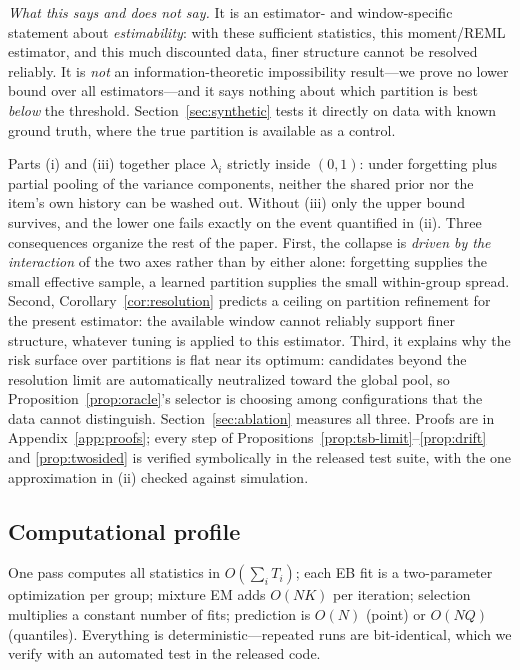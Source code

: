 \documentclass[twocolumn,10pt]{article}
\begin{document}
\emph{What this says and does not say.} It is an estimator- and
window-specific statement about \emph{estimability}: with these
sufficient statistics, this moment/REML estimator, and this much
discounted data, finer structure cannot be resolved reliably. It is
\emph{not} an information-theoretic impossibility result---we prove no
lower bound over all estimators---and it says nothing about which
partition is best \emph{below} the threshold. Section~\ref{sec:synthetic}
tests it directly on data with known ground truth, where the true
partition is available as a control.

Parts (i) and (iii) together place $\lambda_i$ strictly inside $(0,1)$:
under forgetting plus partial pooling of the variance components,
neither the shared prior nor the item's own history can be washed out.
Without (iii) only the upper bound survives, and the lower one fails
exactly on the event quantified in (ii). Three consequences organize the
rest of the paper. First, the collapse is \emph{driven by the
interaction} of the two axes rather than by either alone: forgetting
supplies the small effective sample, a learned partition supplies the
small within-group spread. Second,
Corollary~\ref{cor:resolution} predicts a ceiling on partition refinement
for the present estimator: the available window cannot reliably support
finer structure, whatever tuning is applied to this estimator. Third, it explains why the risk surface over
partitions is flat near its optimum: candidates beyond the resolution
limit are automatically neutralized toward the global pool, so
Proposition~\ref{prop:oracle}'s selector is choosing among configurations
that the data cannot distinguish. Section~\ref{sec:ablation} measures all
three. Proofs are in Appendix~\ref{app:proofs}; every step of
Propositions~\ref{prop:tsb-limit}--\ref{prop:drift} and
\ref{prop:twosided} is verified symbolically in the released test suite,
with the one approximation in (ii) checked against simulation.

\subsection{Computational profile}\label{sec:complexity}
One pass computes all statistics in $O(\sum_i T_i)$; each EB fit is a
two-parameter optimization per group; mixture EM adds $O(NK)$ per
iteration; selection multiplies a constant number of fits; prediction is
$O(N)$ (point) or $O(NQ)$ (quantiles). Everything is
deterministic---repeated runs are bit-identical, which we verify with an
automated test in the released code.
\end{document}

